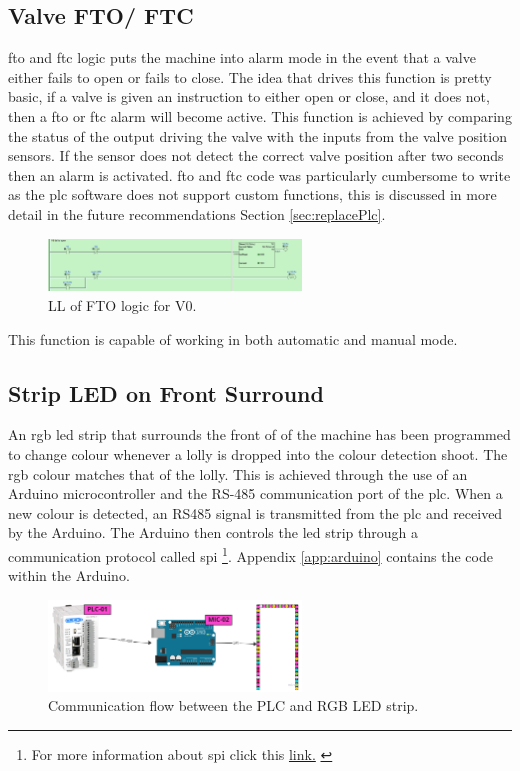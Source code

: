     \subsection{Valve FTO/ FTC} \label{sec:valveFtoFtc}
        \acrfull{fto} and \acrfull{ftc} logic puts the machine into alarm mode in the event that a valve either fails to open or fails to close. The idea that drives this function is pretty basic, if a valve is given an instruction to either open or close, and it does not, then a \acrshort{fto} or \acrshort{ftc} alarm will become active. This function is achieved by comparing the status of the output driving the valve with the inputs from the valve position sensors. If the sensor does not detect the correct valve position after two seconds then an alarm is activated. \acrshort{fto} and \acrshort{ftc} code was particularly cumbersome to write as the \acrshort{plc} software does not support custom functions, this is discussed in more detail in the future recommendations Section \ref{sec:replacePlc}.

        \begin{figure}[H]
            \centering
            \includegraphics[width = 0.6\textwidth]{2_images/ftoLl}
            \caption{LL of FTO logic for V0.}
            \label{fig:ftoLl}
        \end{figure}          
        This function is capable of working in both automatic and manual mode.   
        
    \subsection{Strip LED on Front Surround} \label{sec:stripLed}
        An \acrshort{rgb} \acrshort{led} strip that surrounds the front of of the machine has been programmed to change colour whenever a lolly is dropped into the colour detection shoot. The \acrshort{rgb} colour matches that of the lolly. This is achieved through the use of an Arduino microcontroller and the RS-485 communication port of the \acrshort{plc}. When a new colour is detected, an RS485 signal is transmitted from the \acrshort{plc} and received by the Arduino. The Arduino then controls the \acrshort{led} strip through a communication protocol called \acrshort{spi} \footnote{For more information about \acrshort{spi} click this \href{https://learn.sparkfun.com/tutorials/serial-peripheral-interface-spi/all}{link.} \cite{spi}}. Appendix \ref{app:arduino} contains the code within the Arduino.

        \begin{figure}[H]
            \centering
            \includegraphics[width = 0.6\textwidth]{2_images/rgbStrip}
            \caption{Communication flow between the PLC and RGB LED strip.}
            \label{fig:rgbStrip}
        \end{figure} 